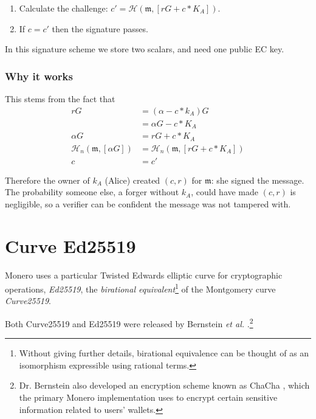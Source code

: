 \begin{enumerate}
	\item Calculate the challenge: \(c' = \mathcal{H}(\mathfrak{m},[r G + c*K_A])\).
	\item If $c = c'$ then the signature passes.
\end{enumerate}

In this signature scheme we store two scalars, and need one public EC key.

\subsubsection*{Why it works}

This stems from the fact that
\begin{align*}
  	 r G &= (\alpha - c*k_A) G \\
  	  	 &= \alpha G - c*K_A \\
\alpha G &= r G + c*K_A \\
\mathcal{H}_n(\mathfrak{m},[\alpha G]) &= \mathcal{H}_n(\mathfrak{m},[r G + c*K_A]) \\
       c &= c'
\end{align*}

Therefore the owner of $k_A$ (Alice) created $(c,r)$ for $\mathfrak{m}$: she signed the message. The probability someone else, a forger without $k_A$, could have made $(c,r)$ is negligible, so a verifier can be confident the message was not tampered with.



\section{Curve Ed25519}
\label{Ed25519_section}

Monero uses a particular Twisted Edwards elliptic curve for cryptographic operations, {\em Ed25519}, the {\em birational equivalent}\footnote{\label{birational_note}Without giving further details, birational equivalence can be thought of as an isomorphism expressible using rational terms.} 
of the Montgomery curve {\em Curve25519}.

Both Curve25519 and Ed25519 were released by Bernstein {\em et al.} \cite{Bernstein2008, Bernstein2012, Bernstein2007}.\footnote{Dr. Bernstein also developed an encryption scheme known as ChaCha \cite{Bernstein_chacha,chacha-irtf}, which the primary Monero implementation uses to encrypt certain sensitive information related to users' wallets.}

